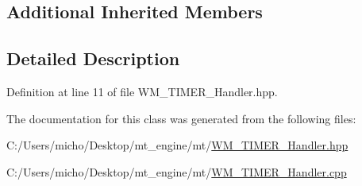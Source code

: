 \subsection*{Additional Inherited Members}


\subsection{Detailed Description}


Definition at line 11 of file W\+M\+\_\+\+T\+I\+M\+E\+R\+\_\+\+Handler.\+hpp.



The documentation for this class was generated from the following files\+:\begin{DoxyCompactItemize}
\item 
C\+:/\+Users/micho/\+Desktop/mt\+\_\+engine/mt/\hyperlink{_w_m___t_i_m_e_r___handler_8hpp}{W\+M\+\_\+\+T\+I\+M\+E\+R\+\_\+\+Handler.\+hpp}\item 
C\+:/\+Users/micho/\+Desktop/mt\+\_\+engine/mt/\hyperlink{_w_m___t_i_m_e_r___handler_8cpp}{W\+M\+\_\+\+T\+I\+M\+E\+R\+\_\+\+Handler.\+cpp}\end{DoxyCompactItemize}
